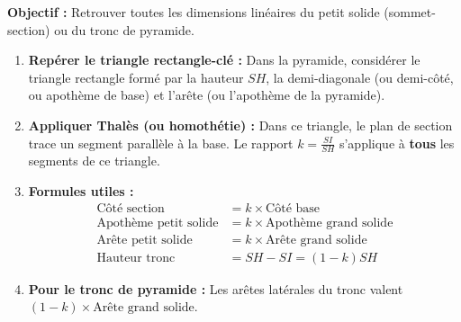 \documentclass[11pt]{article}
\begin{document}
\begin{methode}
    \textbf{Objectif :} Retrouver toutes les dimensions linéaires du petit solide (sommet-section) ou du tronc de pyramide.
    \begin{enumerate}
        \item \textbf{Repérer le triangle rectangle-clé :} Dans la pyramide, considérer le triangle rectangle formé par la hauteur $SH$, la demi-diagonale (ou demi-côté, ou apothème de base) et l'arête (ou l'apothème de la pyramide).
        \item \textbf{Appliquer Thalès (ou homothétie) :} Dans ce triangle, le plan de section trace un segment parallèle à la base. Le rapport $k = \frac{SI}{SH}$ s'applique à \textbf{tous} les segments de ce triangle.
        \item \textbf{Formules utiles :}
            \begin{align*}
                \text{Côté section} &= k \times \text{Côté base} \\
                \text{Apothème petit solide} &= k \times \text{Apothème grand solide} \\
                \text{Arête petit solide} &= k \times \text{Arête grand solide} \\
                \text{Hauteur tronc} &= SH - SI = (1-k)SH
            \end{align*}
        \item \textbf{Pour le tronc de pyramide :} Les arêtes latérales du tronc valent $(1-k) \times \text{Arête grand solide}$.
    \end{enumerate}
\end{methode}
\end{document}

